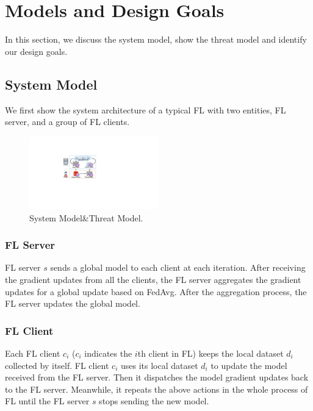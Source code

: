 \documentclass[journal]{IEEEtran}
\begin{document}
\section{Models and Design Goals}

In this section, we discuss the system model, show the threat model and identify our design goals.

\subsection{System Model}We first show the system architecture of a typical FL with two entities, FL server, and a group of FL clients.
  \begin{figure}
    \centering
  \includegraphics[width=0.5\textwidth]{figures/Figure_System.pdf}
  \caption{System Model\&Threat Model.}
  \label{fig_system}
  \end{figure}   
\subsubsection{{FL Server}} FL server $s$ sends a global model to each client at each iteration. After receiving the gradient updates from all the clients, the FL server aggregates the gradient updates for a global update based on FedAvg. After the aggregation process, the FL server updates the global model.

\subsubsection{{FL Client}} Each FL client {$c_{i}$} ($c_{i}$ indicates the $i$th client in FL) keeps the local dataset $d_{i}$ collected by itself. FL client $c_{i}$ uses its local dataset $d_{i}$ to update the model received from the FL server. Then it dispatches the model gradient updates back to the FL server. Meanwhile, it repeats the above actions in the whole process of FL until the FL server $s$ stops sending the new model.
\end{document}
